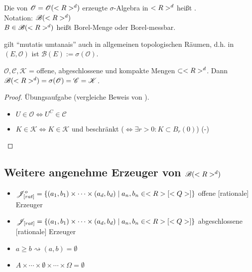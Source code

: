 \begin{definition}
	Die von $\mathscr{O} = \mathscr{O}(<R>^d)$ erzeugte $\sigma$-Algebra in $<R>^d$ heißt .\\
	Notation: $\mathscr{B}(<R>^d)$\\
	$B \in \mathscr{B}(<R>^d)$ heißt Borel-Menge oder Borel-messbar.
\end{definition}

\begin{*remark}
	 gilt ``mutatis umtanais'' auch in allgemeinen topologischen Räumen, d.h. in $(E, \mathscr{O})$ ist $\mathscr{B}(E) := \sigma(\mathscr{O})$.
\end{*remark}

\begin{proposition}
	$\mathscr{O}, \mathscr{C}, \mathscr{K}$ = offene, abgeschlossene und kompakte Mengen $\subset <R>^d$. Dann $\mathscr{B}(<R>^d) = \sigma(\mathscr{O}) = \mathscr{C} = \mathscr{K}$.
\end{proposition}

\begin{proof}
	Übungsaufgabe (vergleiche Beweis von ).
	\begin{itemize}
		\item $U \in \mathscr{O} \Leftrightarrow U^C \in \mathscr{C}$
		\item $K \in \mathscr{K} \Leftrightarrow K \in \mathscr{K}$ und beschränkt ($\Leftrightarrow \exists r > 0 \colon K \subset B_r(0)$) (-)
	\end{itemize}
\end{proof}

\subsection*{Weitere angenehme Erzeuger von $\mathscr{B}(<R>^d)$}

\begin{itemize}
	\item $\mathscr{J}_{[rat]}^o = \{ (a_1,b_1) \times \cdots \times (a_d,b_d) \mid a_n, b_n \in <R> [<Q>]\}$ offene [rationale] Erzeuger
	\item $\mathscr{J}_{[rat]} = \{ (a_1,b_1) \times \cdots \times (a_d,b_d) \mid a_n, b_n \in <R> [<Q>]\}$ abgeschlossene [rationale] Erzeuger
\end{itemize}

\begin{hint}
	\begin{itemize}
		\item $a \ge b \rightsquigarrow (a,b) = \emptyset$
		\item $A \times \cdots \times \emptyset \times \cdots \times \Omega = \emptyset$
	\end{itemize}
\end{hint}

